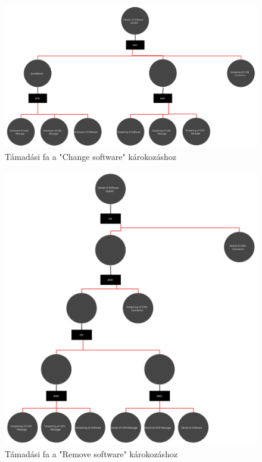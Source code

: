 \begin{figure}[!ht]
	\centering
	\includegraphics[width=120mm, keepaspectratio]{figures/AT-SECSW-01.png}
	\caption{Támadási fa a "Change software" károkozáshoz} 
\end{figure}
\begin{figure}[!ht]
	\centering
	\includegraphics[width=120mm, keepaspectratio]{figures/AT-SECSW-02.png}
	\caption{Támadási fa a "Remove software" károkozáshoz} 
\end{figure}

